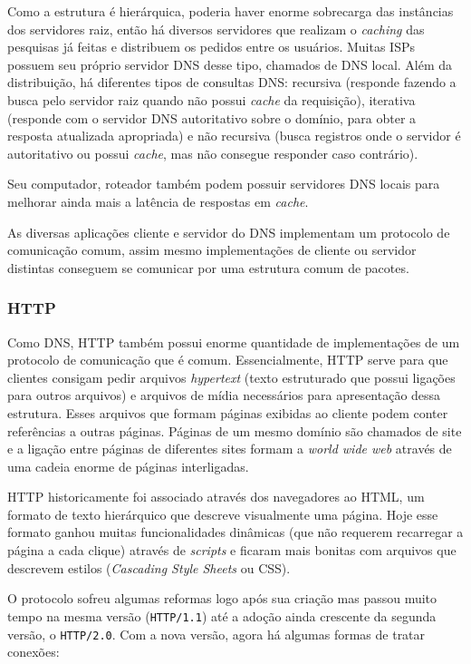 \documentclass[brazilian,a4paper,twocolumn]{article}
\begin{document}
Como a estrutura é hierárquica, poderia haver enorme sobrecarga das instâncias dos servidores raiz, então há diversos servidores que realizam o \textit{caching} das pesquisas já feitas e distribuem os pedidos entre os usuários. Muitas ISPs possuem seu próprio servidor DNS desse tipo, chamados de DNS local. Além da distribuição, há diferentes tipos de consultas DNS: recursiva (responde fazendo a busca pelo servidor raiz quando não possui \textit{cache} da requisição), iterativa (responde com o servidor DNS autoritativo sobre o domínio, para obter a resposta atualizada apropriada) e não recursiva (busca registros onde o servidor é autoritativo ou possui \textit{cache}, mas não consegue responder caso contrário).

Seu computador, roteador também podem possuir servidores DNS locais para melhorar ainda mais a latência de respostas em \textit{cache}.

As diversas aplicações cliente e servidor do DNS implementam um protocolo de comunicação comum, assim mesmo implementações de cliente ou servidor distintas conseguem se comunicar por uma estrutura comum de pacotes.

\subsubsection{HTTP}

Como DNS, HTTP também possui enorme quantidade de implementações de um protocolo de comunicação que é comum. Essencialmente, HTTP serve para que clientes consigam pedir arquivos \textit{hypertext} (texto estruturado que possui ligações para outros arquivos) e arquivos de mídia necessários para apresentação dessa estrutura. Esses arquivos que formam páginas exibidas ao cliente podem conter referências a outras páginas. Páginas de um mesmo domínio são chamados de site e a ligação entre páginas de diferentes sites formam a \textit{world wide web} através de uma cadeia enorme de páginas interligadas.

HTTP historicamente foi associado através dos navegadores ao HTML, um formato de texto hierárquico que descreve visualmente uma página. Hoje esse formato ganhou muitas funcionalidades dinâmicas (que não requerem recarregar a página a cada clique) através de \textit{scripts} e ficaram mais bonitas com arquivos que descrevem estilos (\textit{Cascading Style Sheets} ou CSS).

O protocolo sofreu algumas reformas logo após sua criação mas passou muito tempo na mesma versão (\texttt{HTTP/1.1}) até a adoção ainda crescente da segunda versão, o \texttt{HTTP/2.0}. Com a nova versão, agora há algumas formas de tratar conexões:
\end{document}
